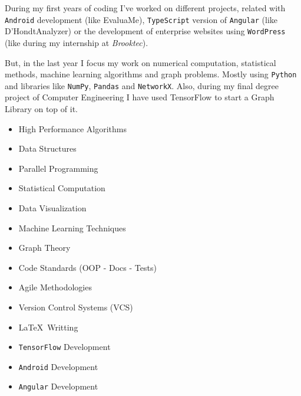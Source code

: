 \documentclass{friggeri-cv}
\begin{document}
        During my first years of coding I've worked on different projects, related with \texttt{Android} development (like EvaluaMe), \texttt{TypeScript} version of \texttt{Angular} (like D'HondtAnalyzer) or the development of enterprise websites using \texttt{WordPress} (like during my internship at \emph{Brooktec}).

        But, in the last year I focus my work on numerical computation, statistical methods, machine learning algorithms and graph problems. Mostly using \texttt{Python} and libraries like \texttt{NumPy}, \texttt{Pandas} and \texttt{NetworkX}. Also, during my final degree project of Computer Engineering I have used TensorFlow to start a Graph Library on top of it.

        \noindent
        \begin{minipage}[t]{0.5\linewidth}
          \begin{itemize}
          	\item{High Performance Algorithms}
      	    \item{Data Structures}
            \item{Parallel Programming}
            \item{Statistical Computation}
            \item{Data Visualization}
            \item{Machine Learning Techniques}
            \item{Graph Theory}
          \end{itemize}
        \end{minipage}%
        \begin{minipage}[t]{0.5\linewidth}
          \begin{itemize}
            \item{Code Standards (OOP - Docs - Tests)}
            \item{Agile Methodologies}
            \item{Version Control Systems (VCS)}
          	\item{\LaTeX \ Writting}
            \item{\texttt{TensorFlow} Development}
            \item{\texttt{Android} Development}
            \item{\texttt{Angular} Development}
          \end{itemize}
        \end{minipage}
        \par\bigskip
\end{document}
